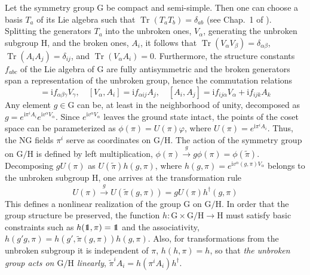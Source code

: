 \documentclass[final,2p,times,12pt,sort&compress]{elsarticle}
\newcommand\gr[1]{\mathrm{#1}}              %
\newcommand\he[1]{#1^{\dagger}}             %
\newcommand\imag{\mathrm i}                 %
\DeclareRobustCommand\openone{\leavevmode\hbox{\small1\normalsize\kern-.33em1}}
\newcommand\vp{\varphi}
\DeclareMathOperator{\Tr}{Tr}
\begin{document}
Let the symmetry group $\gr G$ be compact and semi-simple. Then one can choose
a basis $T_a$ of its Lie algebra such that $\Tr(T_aT_b)=\delta_{ab}$
(see Chap.~1 of \cite{Barut:1977ba}). Splitting the generators $T_a$ into the
unbroken ones, $V_\alpha$, generating the unbroken subgroup $\gr H$, and the
broken ones, $A_i$, it follows that $\Tr(V_\alpha
V_\beta)=\delta_{\alpha\beta}$, $\Tr(A_iA_j)=\delta_{ij}$, and $\Tr(V_\alpha
A_i)=0$. Furthermore, the structure constants $f_{abc}$ of the Lie algebra of
$\gr G$ are fully antisymmetric and the broken generators span a representation
of the unbroken group, hence the commutation relations
\begin{equation}
[V_\alpha,V_\beta]=\imag f_{\alpha\beta\gamma}V_\gamma,\quad
[V_\alpha,A_i]=\imag f_{\alpha ij}A_j,\quad
[A_i,A_j]=\imag f_{ij\alpha}V_\alpha+\imag f_{ijk}A_k
\end{equation}
Any element $g\in\gr G$ can be, at least in the neighborhood of unity,
decomposed as $g=e^{\imag\pi^iA_i}e^{\imag v^\alpha V_\alpha}$. Since $e^{\imag
v^\alpha V_\alpha}$ leaves the ground state intact, the points of the coset
space can be parameterized as $\phi(\pi)=U(\pi)\vp$, where
$U(\pi)=e^{\imag\pi^iA_i}$. Thus, the NG fields $\pi^i$ serve as coordinates on
$\gr{G/H}$. The action of the symmetry group on $\gr{G/H}$ is defined by left
multiplication, $\phi(\pi)\xrightarrow{g}g\phi(\pi)=\phi(\tilde\pi)$.
Decomposing $gU(\pi)$ as $U(\tilde\pi)h(g,\pi)$, where $h(g,\pi)=e^{\imag
v^\alpha(g,\pi)V_\alpha}$ belongs to the unbroken subgroup $\gr H$, one arrives
at the transformation rule
\begin{equation}
U(\pi)\xrightarrow{g}U(\tilde\pi(g,\pi))=gU(\pi)\he h(g,\pi)
\label{coset_transfo}
\end{equation}
This defines a nonlinear realization of the group $\gr G$ on $\gr{G/H}$. In
order that the group structure be preserved, the function $h:\gr
G\times\gr{G/H}\to\gr H$ must satisfy basic constraints such as
$h(\openone,\pi)=\openone$ and the associativity,
$h(g'g,\pi)=h(g',\tilde\pi(g,\pi))h(g,\pi)$. Also, for transformations from the
unbroken subgroup it is independent of $\pi$, $h(h,\pi)=h$, so that \emph{the
unbroken group acts on $\gr{G/H}$ linearly}, $\tilde\pi^iA_i=h(\pi^iA_i)\he h$.
\end{document}
